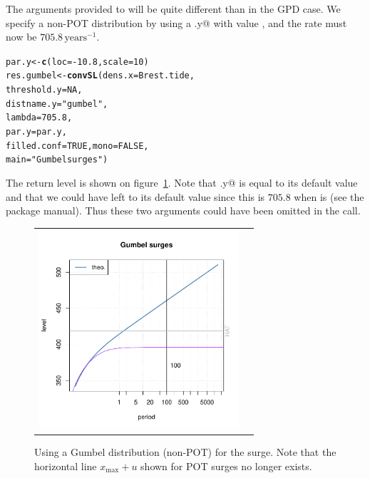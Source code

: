 \documentclass[11pt,a4paper]{report}\usepackage[]{graphicx}\usepackage[]{color}
\makeatletter
\newcommand{\hlnum}[1]{\textcolor[rgb]{0.686,0.059,0.569}{#1}}%
\newcommand{\hlstr}[1]{\textcolor[rgb]{0.192,0.494,0.8}{#1}}%
\newcommand{\hlopt}[1]{\textcolor[rgb]{0,0,0}{#1}}%
\newcommand{\hlstd}[1]{\textcolor[rgb]{0.345,0.345,0.345}{#1}}%
\newcommand{\hlkwb}[1]{\textcolor[rgb]{0.69,0.353,0.396}{#1}}%
\newcommand{\hlkwc}[1]{\textcolor[rgb]{0.333,0.667,0.333}{#1}}%
\newcommand{\hlkwd}[1]{\textcolor[rgb]{0.737,0.353,0.396}{\textbf{#1}}}%
\newenvironment{kframe}{%
 \def\at@end@of@kframe{}%
 \ifinner\ifhmode%
  \def\at@end@of@kframe{\end{minipage}}%
  \begin{minipage}{\columnwidth}%
 \fi\fi%
 \def\FrameCommand##1{\hskip\@totalleftmargin \hskip-\fboxsep
 \colorbox{shadecolor}{##1}\hskip-\fboxsep
     \hskip-\linewidth \hskip-\@totalleftmargin \hskip\columnwidth}%
 \MakeFramed {\advance\hsize-\width
   \@totalleftmargin\z@ \linewidth\hsize
   \@setminipage}}%
 {\par\unskip\endMakeFramed%
 \at@end@of@kframe}
\newenvironment{knitrout}{}{} %
\newcommand{\Up}[1]{#1_{\mathrm{max}}}
\makeatother
\begin{document}
The arguments provided to \verb@convSL@ will be quite different than
in the GPD case.  We specify a non-POT distribution by using a
\verb@threshold.y@ with value \verb@NA@, and the rate \verb@lambda@
must now be $705.8\,\textrm{years}^{-1}$.

\begin{knitrout}
\color{fgcolor}\begin{kframe}
\begin{alltt}
\hlstd{par.y} \hlkwb{<-} \hlkwd{c}\hlstd{(}\hlkwc{loc} \hlstd{=} \hlopt{-}\hlnum{10.8}\hlstd{,} \hlkwc{scale} \hlstd{=} \hlnum{10}\hlstd{)}
\hlstd{res.gumbel} \hlkwb{<-} \hlkwd{convSL}\hlstd{(}\hlkwc{dens.x} \hlstd{= Brest.tide,}
                     \hlkwc{threshold.y} \hlstd{=} \hlnum{NA}\hlstd{,}
                     \hlkwc{distname.y} \hlstd{=} \hlstr{"gumbel"}\hlstd{,}
                     \hlkwc{lambda} \hlstd{=} \hlnum{705.8}\hlstd{,}
                     \hlkwc{par.y} \hlstd{= par.y,}
                     \hlkwc{filled.conf} \hlstd{=} \hlnum{TRUE}\hlstd{,} \hlkwc{mono} \hlstd{=} \hlnum{FALSE}\hlstd{,}
                     \hlkwc{main} \hlstd{=} \hlstr{"Gumbel surges"}\hlstd{)}
\end{alltt}
\end{kframe}
\end{knitrout}

\noindent
The return level is shown on figure~\ref{BrestSurgeGEV}.  Note that
\verb@threshold.y@ is equal to its default value \verb@NA@ and that we
could have left \verb@lambda@ to its default value since this is
$705.8$ when \verb@lambda@ is \verb@NA@ (see the package manual). Thus
these two arguments could have been omitted in the call.

\begin{figure}
   \centering
   \begin{tabular}{c c} 
     \includegraphics[width=7.4cm]{Rgraphics/figBrestConvGEV-1.pdf} 
   \end{tabular}
   \caption{\label{BrestSurgeGEV} Using a Gumbel distribution
     (non-POT) for the surge. Note that the horizontal line $\Up{x} +
     u$ shown for POT surges no longer exists.}
\end{figure}
\end{document}
